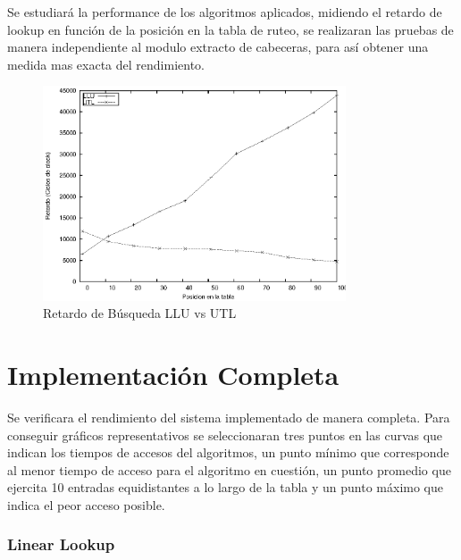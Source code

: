 Se estudiará la performance de los algoritmos aplicados, midiendo el retardo de lookup en función de la posición en la tabla de ruteo, se realizaran las pruebas de manera independiente al modulo extracto de cabeceras, para así obtener una medida mas exacta del rendimiento.

\begin{figure}[h]
  \centering
	\includegraphics[width=0.8\textwidth]{5-resultados/graf/llu-utlsof.eps}
  \caption{Retardo de Búsqueda LLU vs UTL}
  \label{fig}
\end{figure}

\section{Implementación Completa}

Se verificara el rendimiento del sistema implementado de manera completa. Para conseguir gráficos representativos se seleccionaran tres puntos en las curvas que indican los tiempos de accesos del algoritmos, un punto mínimo que corresponde al menor tiempo de acceso para el algoritmo en cuestión, un punto promedio que ejercita 10 entradas equidistantes a lo largo de la tabla y un punto máximo que indica el peor acceso posible. 

\subsubsection{Linear Lookup}


